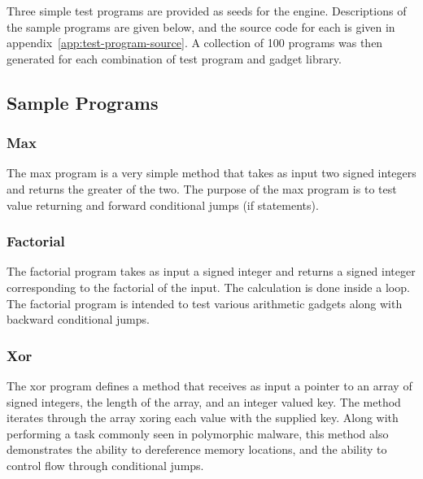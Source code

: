 \documentclass[finalcopy,short]{srpaper}
\begin{document}
        Three simple test programs are provided as seeds for the engine.
        Descriptions of the sample programs are given below, and the source code
        for each is given in appendix~\ref{app:test-program-source}. A
        collection of 100 programs was then generated for each combination of
        test program and gadget library.
        
        \subsection{Sample Programs}

            \subsubsection{Max}

                The max program is a very simple method that takes as input two
                signed integers and returns the greater of the two. The purpose
                of the max program is to test value returning and forward
                conditional jumps (if statements).

            \subsubsection{Factorial}

                The factorial program takes as input a signed integer and
                returns a signed integer corresponding to the factorial of the
                input. The calculation is done inside a loop. The factorial
                program is intended to test various arithmetic gadgets along
                with backward conditional jumps.

            \subsubsection{Xor}

                The xor program defines a method that receives as input a
                pointer to an array of signed integers, the length of the array,
                and an integer valued key. The method iterates through the array
                xoring each value with the supplied key. Along with performing a
                task commonly seen in polymorphic malware, this method also
                demonstrates the ability to dereference memory locations, and
                the ability to control flow through conditional jumps.
            
\end{document}
